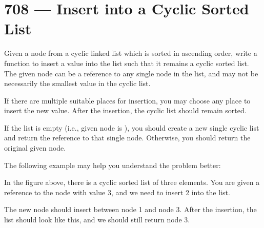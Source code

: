 \section{708 --- Insert into a Cyclic Sorted List}
Given a node from a cyclic linked list which is sorted in ascending order, write a function to insert a value into the list such that it remains a cyclic sorted list. The given node can be a reference to any single node in the list, and may not be necessarily the smallest value in the cyclic list.

If there are multiple suitable places for insertion, you may choose any place to insert the new value. After the insertion, the cyclic list should remain sorted.

If the list is empty (i.e., given node is ), you should create a new single cyclic list and return the reference to that single node. Otherwise, you should return the original given node.

The following example may help you understand the problem better:


\begin{figure}[H]
\end{figure} 



In the figure above, there is a cyclic sorted list of three elements. You are given a reference to the node with value 3, and we need to insert 2 into the list.

 



The new node should insert between node 1 and node 3. After the insertion, the list should look like this, and we should still return node 3.

\begin{figure}[H]
\end{figure}
